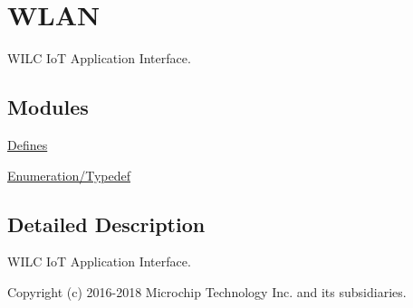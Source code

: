 \hypertarget{group__m2m__wifi}{}\section{W\+L\+AN}
\label{group__m2m__wifi}


W\+I\+LC IoT Application Interface.  


\subsection*{Modules}
\begin{DoxyCompactItemize}
\item 
\hyperlink{group__WlanDefines}{Defines}
\item 
\hyperlink{group__WlanEnums}{Enumeration/\+Typedef}
\end{DoxyCompactItemize}


\subsection{Detailed Description}
W\+I\+LC IoT Application Interface. 

Copyright (c) 2016-\/2018 Microchip Technology Inc. and its subsidiaries.